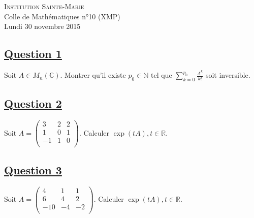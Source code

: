 \documentclass[12pt,a4paper]{report}
\begin{document}
\newcommand{\rA}{\mathcal{A}}
\newcommand{\rB}{\mathcal{B}}
\newcommand{\rC}{\mathcal{C}}
\newcommand{\rG}{\mathcal{G}}
\newcommand{\rF}{\mathcal{F}}
\newcommand{\rO}{\mathcal{O}}
\newcommand{\rP}{\mathcal{P}}
\newcommand{\rH}{\mathcal{H}}
\newcommand{\rR}{\mathcal{R}}
\newcommand{\rE}{\mathcal{E}}
\newcommand{\rL}{\mathcal{L}}
\newcommand{\rM}{\mathcal{M}}
\newcommand{\bK}{\mathbb{K}}
\newcommand{\bQ}{\mathbb{Q}}
\newcommand{\bR}{\mathbb{R}}
\newcommand{\bZ}{\mathbb{Z}}
\newcommand{\bN}{\mathbb{N}}
\newcommand{\bC}{\mathbb{C}}
\newcommand{\bP}{\mathbb{P}}
\newcommand{\bF}{\mathbb{F}}

\ifpdf
{}
\else
{}
\fi

\pagestyle{empty} %

\noindent \textsc{Institution Sainte-Marie}\\
Colle de Mathématiques n°10 (XMP)\\
Lundi 30 novembre 2015


\subsection*{\underline{Question 1}}

Soit $A\in M_n(\bC)$. Montrer qu'il existe $p_0\in\bN$ tel que $\sum\limits_{k=0}^{p_0}\frac{A^k}{k!}$ soit inversible.

\subsection*{\underline{Question 2}}

Soit $A=\begin{pmatrix}
3 & 2 & 2\\
1 & 0 & 1\\
-1 & 1 & 0\\
\end{pmatrix}$. Calculer $\exp(tA), t\in\bR$.

\subsection*{\underline{Question 3}}

Soit $A=\begin{pmatrix}
4 & 1 & 1\\
6 & 4 & 2\\
-10 & -4 & -2\\
\end{pmatrix}$. Calculer $\exp(tA), t\in\bR$.
\end{document}
